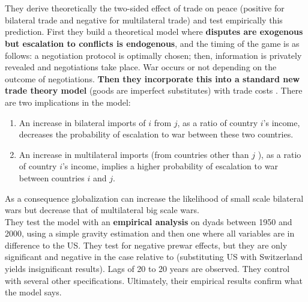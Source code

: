 \documentclass[12pt,a4paper,titlepage,english]{article}
\begin{document}
\section*{\cite{martin2008make}}
They derive theoretically the two-sided effect of trade on peace (positive for bilateral trade and negative for multilateral trade) and test empirically this prediction.
First they build a theoretical model where \textbf{disputes are exogenous but escalation to conflicts is endogenous}, and the timing of the game is as follows: a negotiation protocol is optimally chosen; then, information is privately revealed and negotiations take place. War occurs or not depending on the outcome of negotiations. \textbf{Then they incorporate this into a standard new trade theory model} (goods are imperfect substitutes) with trade costs . There are two implications in the model:
\begin{enumerate}
\item{An increase in bilateral imports of $i$ from $j$, as a ratio of country $i$'s
income, decreases the probability of escalation to war between these two countries.}
\item{An increase in multilateral imports (from countries other than $j$ ), as
a ratio of country $i$'s income, implies a higher probability of escalation to war between countries $i$ and $j$.}
\end{enumerate}
As a consequence globalization can increase the likelihood of small scale bilateral wars but decrease that of multilateral big scale wars.\\
They test the model with an \textbf{empirical analysis} on dyads between 1950 and 2000, using a simple gravity estimation and then one where all variables are in difference to the US. They test for negative prewar effects, but they are only significant and negative in the case relative to (substituting US with Switzerland yields insignificant results). Lags of 20 to 20 years are observed. They control with several other specifications. 
Ultimately, their empirical results confirm what the model says. 
\end{document}
